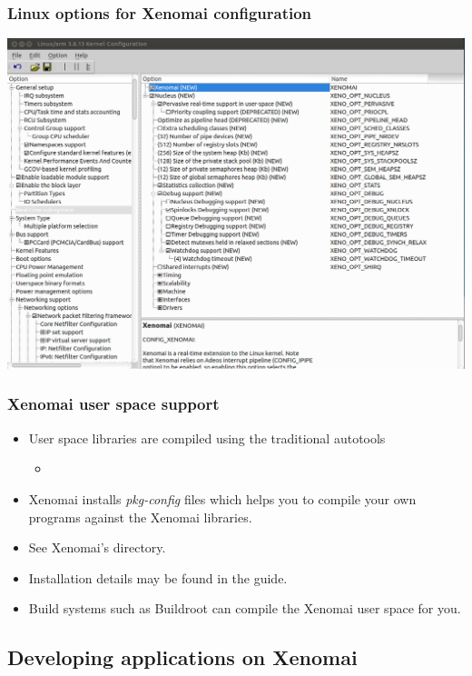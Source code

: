 \begin{frame}
  \frametitle{Linux options for Xenomai configuration}
  \begin{center}
    \includegraphics[height=0.8\textheight]{slides/sysdev-realtime/xenomai-kernel-config.png}
  \end{center}
\end{frame}

\begin{frame}
  \frametitle{Xenomai user space support}
  \begin{itemize}
  \item User space libraries are compiled using the traditional autotools
    \begin{itemize}
    \item {}
    \end{itemize}
  \item Xenomai installs {\em pkg-config} files which helps you to
    compile your own programs against the Xenomai libraries.
  \item See Xenomai's  directory.
  \item Installation details may be found in the 
    guide.
  \item Build systems such as Buildroot can compile the Xenomai user space
    for you.
  \end{itemize}
\end{frame}

\subsection{Developing applications on Xenomai}

